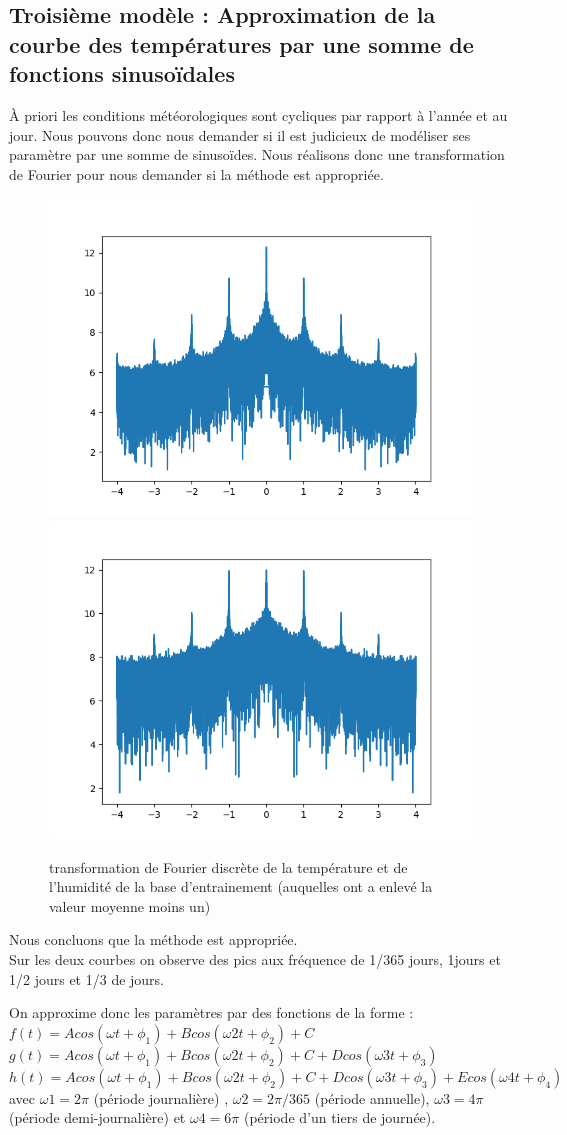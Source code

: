 \documentclass[11pt,a4paper]{article}
\begin{document}
\subsection{Troisième modèle : Approximation de la courbe des températures par une somme de fonctions sinusoïdales}
À priori les conditions météorologiques sont cycliques par rapport à l'année et au jour. Nous pouvons donc nous demander si il est judicieux de modéliser ses paramètre par une somme de sinusoïdes. Nous réalisons donc une
transformation de Fourier pour nous demander si la méthode est appropriée. \\
\begin{figure} [!h]
\centering
\includegraphics[width=0.48 \textwidth]{./imagesTIPE/fftT.png}\quad
\includegraphics[width=0.48 \textwidth]{./imagesTIPE/fftH.png}
\caption{\label{fig:190101Lolita} transformation de Fourier discrète de la température et de l'humidité de la base d'entrainement (auquelles ont a enlevé la valeur moyenne moins un)}
\end{figure}
Nous concluons que la méthode est appropriée. \\
Sur les deux courbes on observe des pics aux fréquence de 1/365 jours, 1jours et 1/2 jours et 1/3 de jours.

On approxime donc les paramètres par des fonctions de la forme : \\
 $f(t) = A cos (\omega t + \phi_{1}) + B cos (\omega2 t + \phi_{2}) + C$  \\
$g(t) = A cos (\omega t + \phi_{1}) + B cos (\omega2 t + \phi_{2}) + C + D cos (\omega3 t + \phi_{3})$ \\
$h(t) = A cos (\omega t + \phi_{1}) + B cos (\omega2 t + \phi_{2}) + C + D cos (\omega3 t + \phi_{3}) + E cos (\omega4 t + \phi_{4})$ \\ 
avec $\omega1 = 2 \pi$ (période journalière) , $\omega2 = 2 \pi /365$ (période annuelle), $\omega3 = 4 \pi$ (période demi-journalière) et $\omega4 = 6\pi$ (période d'un tiers de journée).\\
\end{document}
